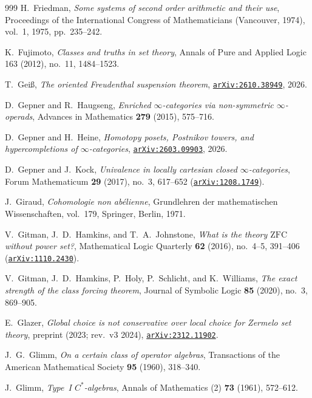 \begin{thebibliography}{999}
H.~Friedman,
\emph{Some systems of second order arithmetic and their use},
Proceedings of the International Congress of Mathematicians (Vancouver, 1974), vol.~1, 1975, pp.~235--242.

K.~Fujimoto,
\emph{Classes and truths in set theory},
Annals of Pure and Applied Logic 163 (2012), no.~11, 1484--1523.

T.~Gei\ss,
\emph{The oriented Freudenthal suspension theorem},
\href{https://arxiv.org/abs/2610.38949}{\texttt{arXiv:2610.38949}}, 2026.

D.~Gepner and R.~Haugseng,
\emph{Enriched $\infty$-categories via non-symmetric $\infty$-operads},
Advances in Mathematics \textbf{279} (2015), 575--716.

D.~Gepner and H.~Heine,
\emph{Homotopy posets, Postnikov towers, and hypercompletions of $\infty$-categories},
\href{https://arxiv.org/abs/2603.09903}{\texttt{arXiv:2603.09903}}, 2026.

D.~Gepner and J.~Kock,
\emph{Univalence in locally cartesian closed $\infty$-categories},
Forum Mathematicum \textbf{29} (2017), no.~3, 617--652 (\href{https://arxiv.org/abs/1208.1749}{\texttt{arXiv:1208.1749}}).

J.~Giraud,
\emph{Cohomologie non ab\'elienne},
Grundlehren der mathematischen Wissenschaften, vol.~179, Springer, Berlin, 1971.

V.~Gitman, J.~D.~Hamkins, and T.~A.~Johnstone,
\emph{What is the theory $\mathrm{ZFC}$ without power set?},
Mathematical Logic Quarterly \textbf{62} (2016), no.~4--5, 391--406 (\href{https://arxiv.org/abs/1110.2430}{\texttt{arXiv:1110.2430}}).

V.~Gitman, J.~D.~Hamkins, P.~Holy, P.~Schlicht, and K.~Williams,
\emph{The exact strength of the class forcing theorem},
Journal of Symbolic Logic \textbf{85} (2020), no.~3, 869--905.

E.~Glazer,
\emph{Global choice is not conservative over local choice for Zermelo set theory},
preprint (2023; rev.\ v3 2024), \href{https://arxiv.org/abs/2312.11902}{\texttt{arXiv:2312.11902}}.

J.~G.~Glimm,
\emph{On a certain class of operator algebras},
Transactions of the American Mathematical Society \textbf{95} (1960), 318--340.

J.~Glimm,
\emph{Type~I $C^*$-algebras},
Annals of Mathematics (2) \textbf{73} (1961), 572--612.


\end{thebibliography}
